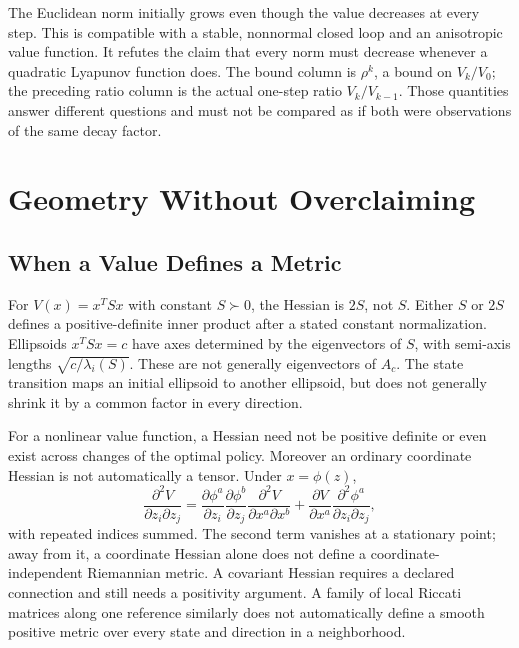 The Euclidean norm initially grows even though the value decreases at every step. This is compatible with a stable, nonnormal closed loop and an anisotropic value function. It refutes the claim that every norm must decrease whenever a quadratic Lyapunov function does. The bound column is $\rho^k$, a bound on $V_k/V_0$; the preceding ratio column is the actual one-step ratio $V_k/V_{k-1}$. Those quantities answer different questions and must not be compared as if both were observations of the same decay factor.

\section{Geometry Without Overclaiming}

\subsection{When a Value Defines a Metric}

For $V(x)=x^TSx$ with constant $S\succ0$, the Hessian is $2S$, not $S$. Either $S$ or $2S$ defines a positive-definite inner product after a stated constant normalization. Ellipsoids $x^TSx=c$ have axes determined by the eigenvectors of $S$, with semi-axis lengths $\sqrt{c/\lambda_i(S)}$. These are not generally eigenvectors of $A_c$. The state transition maps an initial ellipsoid to another ellipsoid, but does not generally shrink it by a common factor in every direction.

For a nonlinear value function, a Hessian need not be positive definite or even exist across changes of the optimal policy. Moreover an ordinary coordinate Hessian is not automatically a tensor. Under $x=\phi(z)$,
\begin{equation}
\frac{\partial^2 V}{\partial z_i\partial z_j}
=\frac{\partial\phi^a}{\partial z_i}
\frac{\partial\phi^b}{\partial z_j}
\frac{\partial^2 V}{\partial x^a\partial x^b}
+\frac{\partial V}{\partial x^a}
\frac{\partial^2\phi^a}{\partial z_i\partial z_j},
\end{equation}
with repeated indices summed. The second term vanishes at a stationary point; away from it, a coordinate Hessian alone does not define a coordinate-independent Riemannian metric. A covariant Hessian requires a declared connection and still needs a positivity argument. A family of local Riccati matrices along one reference similarly does not automatically define a smooth positive metric over every state and direction in a neighborhood.

